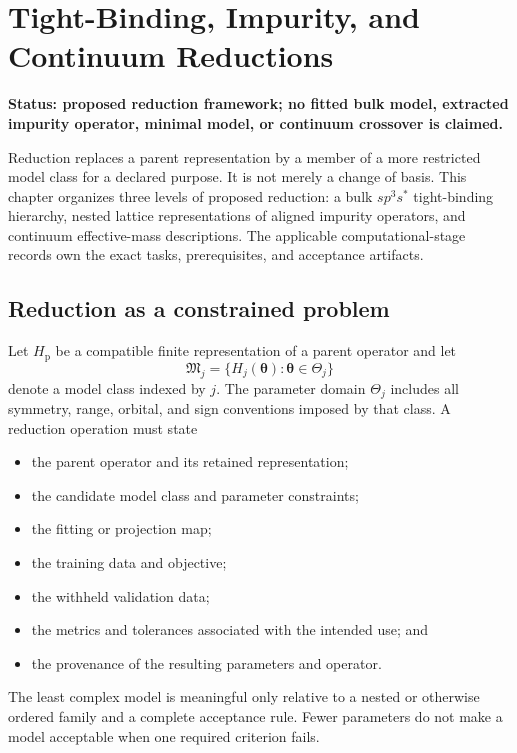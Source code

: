 \chapter{Tight-Binding, Impurity, and Continuum Reductions}
\label{ch:model-reduction}

\textbf{Status: proposed reduction framework; no fitted bulk model, extracted
impurity operator, minimal model, or continuum crossover is claimed.}

Reduction replaces a parent representation by a member of a more restricted
model class for a declared purpose. It is not merely a change of basis. This
chapter organizes three levels of proposed reduction: a bulk
$sp^3s^{\ast}$ tight-binding hierarchy, nested lattice representations of
aligned impurity operators, and continuum effective-mass descriptions. The
applicable computational-stage records own the exact tasks, prerequisites, and
acceptance artifacts.

\section{Reduction as a constrained problem}

Let $H_{\mathrm p}$ be a compatible finite representation of a parent operator
and let
\begin{equation}
  \mathfrak M_j
  =
  \{H_j(\boldsymbol\theta):\boldsymbol\theta\in\Theta_j\}
\end{equation}
denote a model class indexed by $j$. The parameter domain $\Theta_j$ includes
all symmetry, range, orbital, and sign conventions imposed by that class. A
reduction operation must state

\begin{itemize}
  \item the parent operator and its retained representation;
  \item the candidate model class and parameter constraints;
  \item the fitting or projection map;
  \item the training data and objective;
  \item the withheld validation data;
  \item the metrics and tolerances associated with the intended use; and
  \item the provenance of the resulting parameters and operator.
\end{itemize}

The least complex model is meaningful only relative to a nested or otherwise
ordered family and a complete acceptance rule. Fewer parameters do not make a
model acceptable when one required criterion fails.

